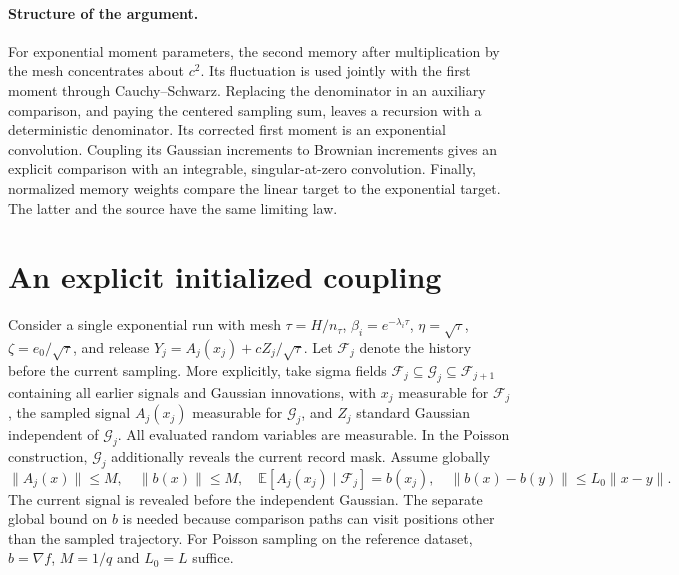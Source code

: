 \documentclass[a4paper,11pt]{article}
\theoremstyle{remark}
\newcommand{\E}{\mathbb E}
\newcommand{\norm}[1]{\lVert#1\rVert}
\begin{document}
\paragraph{Structure of the argument.}
For exponential moment parameters, the second memory after multiplication
by the mesh concentrates about $c^2$. Its fluctuation is used jointly with
the first moment through Cauchy--Schwarz. Replacing the denominator in an
auxiliary comparison, and paying the centered sampling sum, leaves a recursion
with a deterministic denominator. Its corrected first moment is an exponential
convolution. Coupling its Gaussian increments to Brownian increments gives
an explicit comparison with an integrable, singular-at-zero convolution.
Finally, normalized memory weights compare the linear target to the
exponential target. The latter and the source have the same limiting law.

\section{An explicit initialized coupling}\label{sec:coupling}

Consider a single exponential run with mesh $\tau=H/n_\tau$,
$\beta_i=e^{-\lambda_i\tau}$, $\eta=\sqrt\tau$,
$\zeta=e_0/\sqrt\tau$, and release
$Y_j=A_j(x_j)+cZ_j/\sqrt\tau$. Let $\mathcal F_j$ denote the history
before the current sampling. More explicitly, take sigma fields
$\mathcal F_j\subseteq\mathcal G_j\subseteq\mathcal F_{j+1}$ containing
all earlier signals and Gaussian innovations, with $x_j$ measurable for
$\mathcal F_j$, the sampled signal $A_j(x_j)$ measurable for
$\mathcal G_j$, and $Z_j$ standard Gaussian independent of
$\mathcal G_j$. All evaluated random variables are measurable. In the
Poisson construction, $\mathcal G_j$ additionally reveals the current
record mask. Assume globally
\begin{equation}\label{eq:oracle-assumptions}
 \norm{A_j(x)}\le M,\quad \norm{b(x)}\le M,\quad
 \E[A_j(x_j)\mid\mathcal F_j]=b(x_j),\quad
 \norm{b(x)-b(y)}\le L_0\norm{x-y}.
\end{equation}
The current signal is revealed before the independent Gaussian.
The separate global bound on $b$ is needed because comparison paths can
visit positions other than the sampled trajectory. For Poisson sampling
on the reference dataset, $b=\nabla f$, $M=1/q$ and $L_0=L$ suffice.
\end{document}
